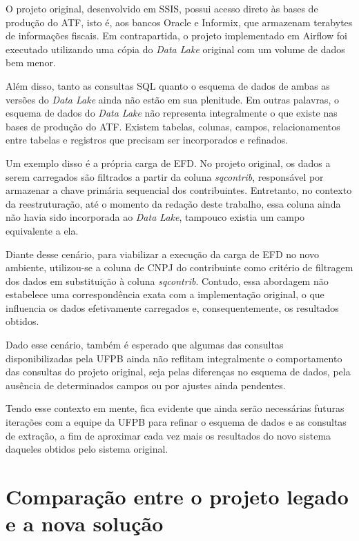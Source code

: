 O projeto original, desenvolvido em SSIS, possui acesso direto às bases de produção do ATF, isto é, aos 
bancos Oracle e Informix, que armazenam terabytes de informações fiscais. Em contrapartida, o projeto 
implementado em Airflow foi executado utilizando uma cópia do \textit{Data Lake} original com um volume de 
dados bem menor.

Além disso, tanto as consultas SQL quanto o esquema de dados de ambas as versões do \textit{Data Lake} 
ainda não estão em sua plenitude. Em outras palavras, o esquema de dados do \textit{Data Lake}
não representa integralmente o que existe nas bases de produção do ATF. Existem tabelas, colunas, campos,
relacionamentos entre tabelas e registros que precisam ser incorporados e refinados.

Um exemplo disso é a própria carga de EFD. No projeto original, os dados a serem carregados são 
filtrados a partir da coluna \textit{sqcontrib}, responsável por armazenar a chave primária
sequencial dos contribuintes. Entretanto, no contexto da reestruturação, até o momento da redação 
deste trabalho, essa coluna ainda não havia sido incorporada ao \textit{Data Lake}, tampouco existia 
um campo equivalente a ela.

Diante desse cenário, para viabilizar a execução da carga de EFD no novo ambiente, utilizou-se a 
coluna de CNPJ do contribuinte como critério de filtragem dos dados em substituição à coluna 
\textit{sqcontrib}. Contudo, essa abordagem não estabelece uma correspondência exata com a 
implementação original, o que influencia os dados efetivamente carregados e, consequentemente, os 
resultados obtidos.

Dado esse cenário, também é esperado que algumas das consultas disponibilizadas pela UFPB 
ainda não reflitam integralmente o comportamento das consultas do projeto original, seja pelas 
diferenças no esquema de dados, pela ausência de determinados campos ou por ajustes ainda pendentes. 

Tendo esse contexto em mente, fica evidente que ainda serão necessárias futuras iterações com a equipe 
da UFPB para refinar o esquema de dados e as consultas de extração, a fim de aproximar cada vez mais os 
resultados do novo sistema daqueles obtidos pelo sistema original.

\section{Comparação entre o projeto legado e a nova solução}

